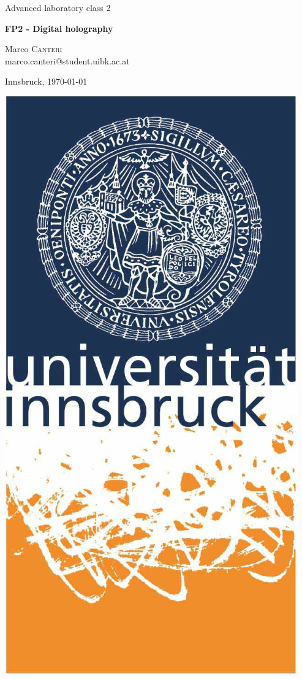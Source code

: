 \documentclass[a4paper,10pt]{article}
\begin{document}
\begin{titlepage}
 \begin{center}
	\Large{Advanced laboratory class 2}
	\end{center}
	\begin{center}
	 \LARGE{\textbf{FP2 - Digital holography}}
	\end{center}
	
	\begin{center}
	
	\large Marco \textsc{Canteri} \\
	marco.canteri@student.uibk.ac.at
	\end{center}
	
	\begin{center}
	\vspace{1cm}
	Innsbruck, \today
	\vspace{2cm}
	\end{center}
	
	\begin{center}
	\includegraphics[scale=0.4]{img/uibk} 
	\end{center}


\end{titlepage}
\end{document}
